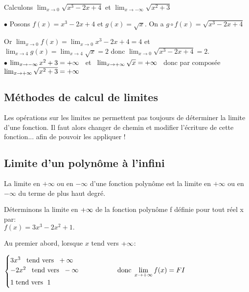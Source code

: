 \begin{example}
 Calculons \quad  $  \lim_{x \to 0} \sqrt{x^{3}-2x+4} $ \; et \; $\lim_{x \to -\infty}\sqrt{x^{2}+3}  $

$ \bullet $  \;  Posons  $ f(x)=x^{3}-2x+4 $ \; et \; $ g(x)=\sqrt{x} $.  \; On a\;  $ g \circ f(x)=  \sqrt{x^{3}-2x+4}  $

Or  $  \lim_{x \to 0}f(x)= \lim_{x \to 0} x^{3}-2x+4=4 $ \;  et \; $\lim_{x \to 4}g(x)=  \lim_{x \to 4} \sqrt{x}=2 $\; donc\; $  \lim_{x \to 0} \sqrt{x^{3}-2x+4}=2 $.\\
$ \bullet $   $ \lim_{x \to -\infty}x^{2}+3  = +\infty $ ~et~ $  \lim_{x \to +\infty} \sqrt{x} = +\infty $~ donc  par composée ~$ \lim_{x \to +\infty}\sqrt{x^{2}+3}=+\infty $
\end{example}

\subsection{ Méthodes de calcul  de limites}
Les opérations sur les limites ne permettent pas toujours de déterminer la limite d'une fonction. Il faut alors changer de chemin et modifier l'écriture de cette fonction... afin de pouvoir les appliquer !
\subsection*{Limite d'un polynôme à l'infini}

\begin{property}
 La limite en $ +\infty $   ou  en $ -\infty $   d'une fonction polynôme est la limite en      $ +\infty $   ou  en $ -\infty $  du terme de plus haut degré.
\end{property}
\begin{example}


Déterminons la limite en $ +\infty  $ de la fonction polynôme f définie pour tout réel x par: \\$ f(x)= 3x^{3}-2x^{2}+1.$
\end{example}



Au premier abord, lorsque $ x $ tend vers $ +\infty $:


$ \begin{cases} 3x^{3}\;\;\;\text{tend vers }\;+\infty  \\
-2x^{2}\;\;\;\text{tend vers } \;-\infty \hspace*{2cm}\text{donc}\;\displaystyle \lim_{x\to +\infty}f(x)=FI\\ 
1\; \text{tend vers }\; 1
 \end{cases}$

